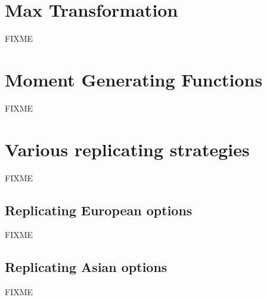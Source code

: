 \documentclass[reqno]{amsart}
\begin{document}
\section{Max Transformation}
FIXME
\section{Moment Generating Functions}
FIXME
\section{Various replicating strategies}
FIXME
\subsection{Replicating European options}
FIXME
\subsection{Replicating Asian options}
FIXME


\end{document}
